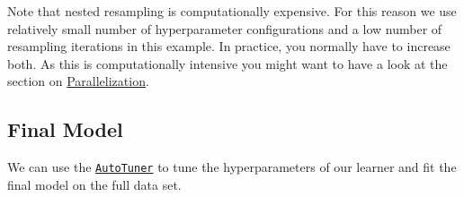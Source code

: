 \documentclass[
]{scrbook}
\newenvironment{Shaded}{\begin{snugshade}}{\end{snugshade}}
\newcommand{\FunctionTok}[1]{\textcolor[rgb]{0.00,0.00,0.00}{#1}}
\newcommand{\NormalTok}[1]{#1}
\newcommand{\SpecialCharTok}[1]{\textcolor[rgb]{0.00,0.00,0.00}{#1}}
\renewenvironment{Shaded} {\begin{snugshade}\small} {\end{snugshade}}
\begin{document}
Note that nested resampling is computationally expensive.
For this reason we use relatively small number of hyperparameter configurations and a low number of resampling iterations in this example.
In practice, you normally have to increase both.
As this is computationally intensive you might want to have a look at the section on \protect\hyperlink{parallelization}{Parallelization}.

\hypertarget{nested-final-model}{%
\subsection{Final Model}\label{nested-final-model}}

We can use the \href{https://mlr3tuning.mlr-org.com/reference/AutoTuner.html}{\texttt{AutoTuner}} to tune the hyperparameters of our learner and fit the final model on the full data set.

\begin{Shaded}
\end{Shaded}
\end{document}
